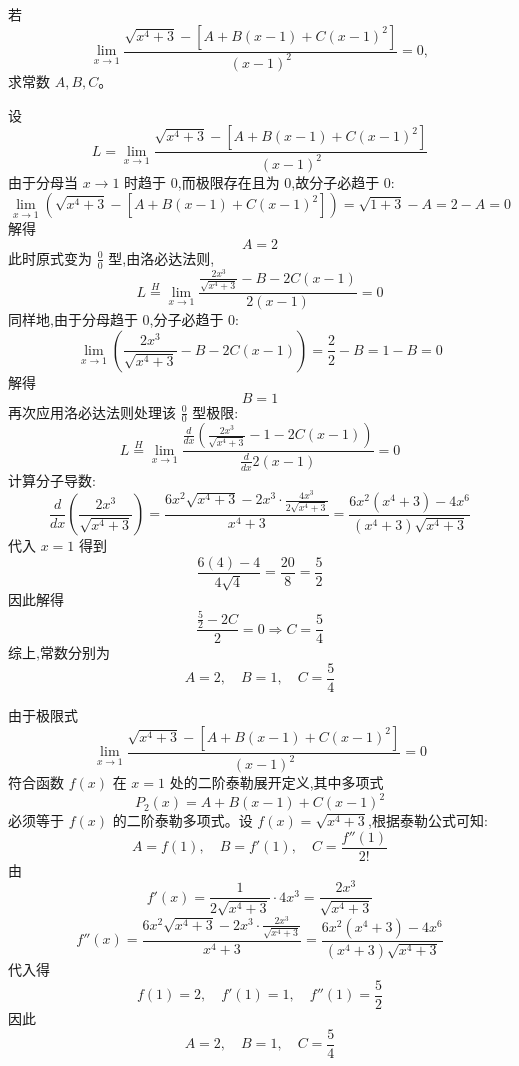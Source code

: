 \begin{questions}
    \question 若
    \[
    \lim_{x \to 1} \frac{\sqrt{x^4 + 3} - [A + B(x - 1) + C(x - 1)^2]}{(x - 1)^2} = 0,
    \]
    求常数 \( A, B, C \)。
    \begin{solution}
        设
        \[
        L = \lim_{x \to 1} \frac{\sqrt{x^4 + 3} - [A + B(x - 1) + C(x - 1)^2]}{(x - 1)^2}
        \]
        由于分母当 \( x \to 1 \) 时趋于 0,而极限存在且为 0,故分子必趋于 0:
        \[
        \lim_{x \to 1} \left( \sqrt{x^4 + 3} - [A + B(x - 1) + C(x - 1)^2] \right) = \sqrt{1 + 3} - A = 2 - A = 0
        \]
        解得
        \[
        A = 2
        \]
        此时原式变为 $\frac{0}{0}$ 型,由洛必达法则,
        \[
        L \overset{H}{=} \lim_{x \to 1} \frac{\frac{2x^3}{\sqrt{x^4 + 3}} - B - 2C(x - 1)}{2(x - 1)} = 0
        \]
        同样地,由于分母趋于 0,分子必趋于 0:
        \[
        \lim_{x \to 1} \left( \frac{2x^3}{\sqrt{x^4 + 3}} - B - 2C(x - 1) \right) = \frac{2}{2} - B = 1 - B = 0
        \]
        解得
        \[
        B = 1
        \]
        再次应用洛必达法则处理该 $\frac{0}{0}$ 型极限:
        \[
        L \overset{H}{=} \lim_{x \to 1} \frac{\frac{d}{dx} \left( \frac{2x^3}{\sqrt{x^4 + 3}} - 1 - 2C(x - 1) \right)}{\frac{d}{dx} 2(x - 1)} = 0
        \]
        计算分子导数:
        \[
        \frac{d}{dx} \left( \frac{2x^3}{\sqrt{x^4 + 3}} \right) = \frac{6x^2\sqrt{x^4+3} - 2x^3 \cdot \frac{4x^3}{2\sqrt{x^4+3}}}{x^4 + 3} = \frac{6x^2(x^4+3) - 4x^6}{(x^4+3)\sqrt{x^4+3}}
        \]
        代入 \( x = 1 \) 得到
        \[
        \frac{6(4) - 4}{4\sqrt{4}} = \frac{20}{8} = \frac{5}{2}
        \]
        因此解得
        \[
        \frac{\frac{5}{2} - 2C}{2} = 0 \Rightarrow C = \frac{5}{4}
        \]
        综上,常数分别为
        \[
        A = 2,\quad B = 1,\quad C = \frac{5}{4}
        \]
    \end{solution}
    \begin{solution}
        由于极限式
        \[
        \lim_{x \to 1} \frac{\sqrt{x^4 + 3} - [A + B(x - 1) + C(x - 1)^2]}{(x - 1)^2} = 0
        \]
        符合函数 $f(x)$ 在 $x=1$ 处的二阶泰勒展开定义,其中多项式 
        \[
        P_2(x) = A + B(x-1) + C(x-1)^2
        \]
        必须等于 $f(x)$ 的二阶泰勒多项式。设 $f(x) = \sqrt{x^4+3}$,根据泰勒公式可知:
        \[
        A = f(1), \quad B = f'(1), \quad C = \frac{f''(1)}{2!}
        \]
        由
        \[
        f'(x) = \frac{1}{2\sqrt{x^4+3}} \cdot 4x^3 = \frac{2x^3}{\sqrt{x^4+3}}
        \]
        \[
        f''(x) = \frac{6x^2\sqrt{x^4+3} - 2x^3 \cdot \frac{2x^3}{\sqrt{x^4+3}}}{x^4+3} = \frac{6x^2(x^4+3) - 4x^6}{(x^4+3)\sqrt{x^4+3}}
        \]
        代入得
        \[
        f(1) = 2, \quad f'(1) = 1, \quad f''(1) = \frac{5}{2}
        \]
        因此
        \[
        A = 2,\quad B = 1,\quad C = \frac{5}{4}
        \]
    \end{solution}


\end{questions}
